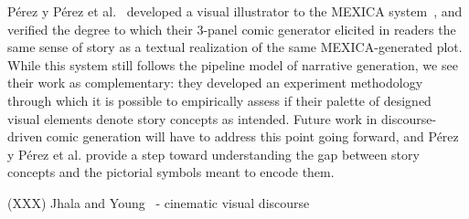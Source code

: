 P\'erez y P\'erez et al.~\cite{perezyperez2012illustrating} developed a 
visual illustrator to the MEXICA system~\cite{perez2001mexica}, and verified
%
the degree to which their 3-panel comic generator 
elicited in readers the same sense of story as a textual realization of 
the same MEXICA-generated plot. 
%
While this system still follows the pipeline model of narrative 
generation, we see their work as complementary: they developed an experiment 
methodology through which it is possible to empirically assess if
their palette of designed visual elements denote story concepts as intended. 
Future work in discourse-driven comic generation will have to address this
point going forward, and P\'erez y P\'erez et al. provide a step
toward understanding the gap between story concepts and the pictorial symbols
meant to encode them. 


(XXX)
Jhala and Young~\cite{jhala2010cinematic} - cinematic visual discourse

